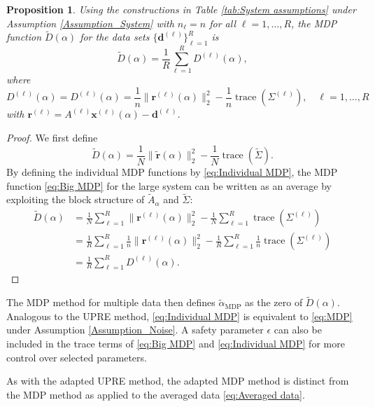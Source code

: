 \documentclass[12pt]{article}
\newcommand{\dVec}{\mathbf{d}}	%
\newcommand{\rVec}{\mathbf{r}}	%
\newcommand{\xVec}{\mathbf{x}}	%
\DeclareMathOperator{\trace}{trace}		%
\newcommand{\regparam}{\alpha}  %
\newcommand{\D}{D}	%
\newcommand{\safeparam}{\epsilon}	%
\newtheorem{proposition}{Proposition}[section]
\begin{document}
\begin{proposition}
Using the constructions in Table \ref{tab:System assumptions} under Assumption \ref{Assumption_System} with $n_\ell = n$ for all $\ell = 1,\ldots,R$, the MDP function $\widetilde{\D}(\regparam)$ for the data sets $\{\dVec^{(\ell)}\}_{\ell=1}^R$ is
\begin{equation}
\label{eq:Averaged MDP}
\widetilde{\D}(\regparam) = \frac{1}{R} \sum_{\ell=1}^R \D^{(\ell)}(\regparam),
\end{equation}
where
\begin{equation}
\label{eq:Individual MDP}
\D^{(\ell)}(\regparam) = \D^{(\ell)}(\regparam) = \frac{1}{n}\|\rVec^{(\ell)}(\regparam)\|_2^2 - \frac{1}{n}\trace\left(\Sigma^{(\ell)}\right), \quad \ell = 1,\ldots,R
\end{equation}
with $\rVec^{(\ell)} = A^{(\ell)}\xVec^{(\ell)}(\regparam) - \dVec^{(\ell)}$.
\end{proposition}

\begin{proof}
We first define
\begin{equation}
\label{eq:Big MDP}
\widetilde{\D}(\regparam) = \frac{1}{N}\|\widetilde{\rVec}(\regparam)\|_2^2 - \frac{1}{N}\trace\left(\widetilde{\Sigma}\right).
\end{equation}
By defining the individual MDP functions by \eqref{eq:Individual MDP}, the MDP function \eqref{eq:Big MDP} for the large system can be written as an average by exploiting the block structure of $\widetilde{A}_{\regparam}$ and $\widetilde{\Sigma}$:
\begin{align*}
\widetilde{\D}(\regparam) &= \frac{1}{N}\sum_{\ell=1}^R \|\rVec^{(\ell)}(\regparam)\|_2^2 - \frac{1}{N}\sum_{\ell=1}^R \trace\left(\Sigma^{(\ell)}\right) \nonumber \\
&= \frac{1}{R}\sum_{\ell=1}^R \frac{1}{n}\|\rVec^{(\ell)}(\regparam)\|_2^2 - \frac{1}{R}\sum_{\ell=1}^R \frac{1}{n}\trace\left(\Sigma^{(\ell)}\right) \nonumber \\
&= \frac{1}{R}\sum_{\ell=1}^R \D^{(\ell)}(\regparam).
\end{align*}
\end{proof}

The MDP method for multiple data then defines $\widetilde{\regparam}_{\textrm{MDP}}$ as the zero of $\widetilde{\D}(\regparam)$. Analogous to the UPRE method, \eqref{eq:Individual MDP} is equivalent to \eqref{eq:MDP} under Assumption \ref{Assumption_Noise}. A safety parameter $\safeparam$ can also be included in the trace terms of \eqref{eq:Big MDP} and \eqref{eq:Individual MDP} for more control over selected parameters. \par 
As with the adapted UPRE method, the adapted MDP method is distinct from the MDP method as applied to the averaged data \eqref{eq:Averaged data}.
\end{document}
